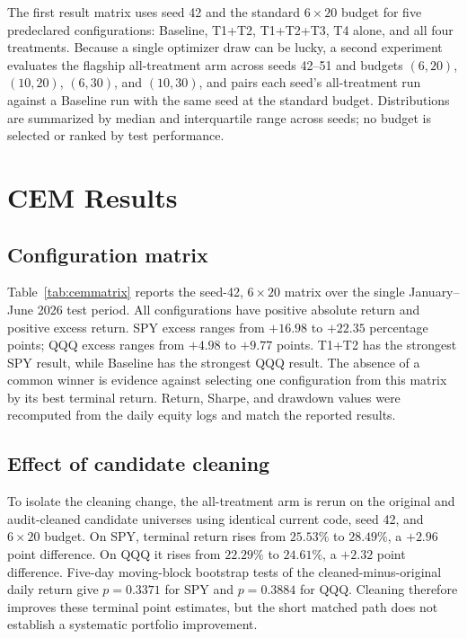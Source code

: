 \documentclass[sigconf,anonymous]{acmart}
\begin{document}
The first result matrix uses seed 42 and the standard $6\times20$ budget for five predeclared configurations: Baseline, T1+T2, T1+T2+T3, T4 alone, and all four treatments. Because a single optimizer draw can be lucky, a second experiment evaluates the flagship all-treatment arm across seeds 42--51 and budgets $(6,20)$, $(10,20)$, $(6,30)$, and $(10,30)$, and pairs each seed's all-treatment run against a Baseline run with the same seed at the standard budget. Distributions are summarized by median and interquartile range across seeds; no budget is selected or ranked by test performance.

\section{CEM Results}

\subsection{Configuration matrix}

Table~\ref{tab:cemmatrix} reports the seed-42, $6\times20$ matrix over the single January--June 2026 test period. All configurations have positive absolute return and positive excess return. SPY excess ranges from $+16.98$ to $+22.35$ percentage points; QQQ excess ranges from $+4.98$ to $+9.77$ points. T1+T2 has the strongest SPY result, while Baseline has the strongest QQQ result. The absence of a common winner is evidence against selecting one configuration from this matrix by its best terminal return. Return, Sharpe, and drawdown values were recomputed from the daily equity logs and match the reported results.



\subsection{Effect of candidate cleaning}

To isolate the cleaning change, the all-treatment arm is rerun on the original and audit-cleaned candidate universes using identical current code, seed 42, and $6\times20$ budget. On SPY, terminal return rises from $25.53\%$ to $28.49\%$, a $+2.96$ point difference. On QQQ it rises from $22.29\%$ to $24.61\%$, a $+2.32$ point difference. Five-day moving-block bootstrap tests of the cleaned-minus-original daily return give $p=0.3371$ for SPY and $p=0.3884$ for QQQ. Cleaning therefore improves these terminal point estimates, but the short matched path does not establish a systematic portfolio improvement.
\end{document}
